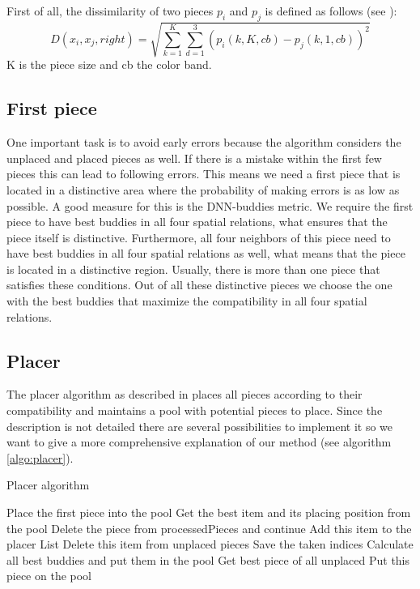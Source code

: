 \documentclass[11pt]{report}
\begin{document}
First of all, the dissimilarity of two pieces $p_i$ and $p_j$ is defined as follows (see \cite{sholomon2016dnn}): 
\begin{equation}\label{eq:dissimilarity}
	D(x_i,x_j,right) = \sqrt{\sum_{k=1}^K \sum_{d=1}^3 (p_i(k,K,cb) - p_j(k,1,cb))^2}
\end{equation}
K is the piece size and cb the color band.

\subsection{First piece}
One important task is to avoid early errors because the algorithm considers the unplaced and placed pieces as well. If there is a mistake within the first few pieces this can lead to following errors.
This means we need a first piece that is located in a distinctive area where the probability of making errors is as low as possible. A good measure for this is the DNN-buddies metric. We require the first piece to have best buddies in all four spatial relations, what ensures that the piece itself is distinctive. Furthermore, all four neighbors of this piece need to have best buddies in all four spatial relations as well, what means that the piece is located in a distinctive region. 
Usually, there is more than one piece that satisfies these conditions. Out of all these distinctive pieces we choose the one with the best buddies that maximize the compatibility in all four spatial relations.

\subsection{Placer}
The placer algorithm as described in \cite{Paikin2015} places all pieces according to their compatibility and maintains a pool with potential pieces to place. Since the description is not detailed there are several possibilities to implement it so we want to give a more comprehensive explanation of our method (see algorithm \ref{algo:placer}).

\begin{algorithm}
	\caption{Placer algorithm}
	\label{algo:placer}
	\begin{algorithmic}
		\State Place the first piece into the pool
		\State Get the best item and its placing position from the pool
		\State Delete the piece from processedPieces and continue \EndIf
		\State Add this item to the placer List
		\State Delete this item from unplaced pieces
		\State Save the taken indices
		\State Calculate all best buddies and put them in the pool
		\EndWhile
		\State Get best piece of all unplaced
		\State Put this piece on the pool
		\EndIf
		\EndWhile
	\end{algorithmic}
\end{algorithm}
\end{document}
